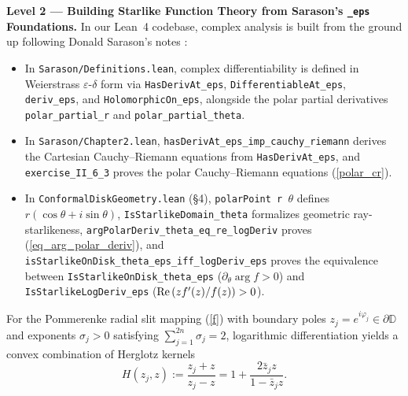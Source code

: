 \documentclass[11pt,reqno]{amsart}
\numberwithin{equation}{section}
\renewcommand{\phi}{\varphi}
\newcommand{\D}{\mathbb{D}}
\newcommand{\eps}{\varepsilon}
\newcommand{\re}{\mbox{\rm Re\,}}
\begin{document}
\begin{leveltwo}
\noindent\textbf{\textcolor{l2border}{Level 2 --- Building Starlike Function Theory from Sarason's \texttt{\_eps} Foundations.}}
In our Lean~4 codebase, complex analysis is built from the ground up following Donald Sarason's notes \cite{Sar}:
\begin{itemize}
\item In \texttt{Sarason/Definitions.lean}, complex differentiability is defined in Weierstrass $\eps$-$\delta$ form via \texttt{HasDerivAt\_eps}, \texttt{DifferentiableAt\_eps}, \texttt{deriv\_eps}, and \texttt{HolomorphicOn\_eps}, alongside the polar partial derivatives \texttt{polar\_partial\_r} and \texttt{polar\_partial\_theta}.
\item In \texttt{Sarason/Chapter2.lean}, \texttt{hasDerivAt\_eps\_imp\_cauchy\_riemann} derives the Cartesian Cauchy--Riemann equations from \texttt{HasDerivAt\_eps}, and \texttt{exercise\_II\_6\_3} proves the polar Cauchy--Riemann equations (\ref{polar_cr}).
\item In \texttt{ConformalDiskGeometry.lean} (\S 4), \texttt{polarPoint r $\theta$} defines $r(\cos\theta + i\sin\theta)$, \texttt{IsStarlikeDomain\_theta} formalizes geometric ray-starlikeness, \texttt{argPolarDeriv\_theta\_eq\_re\_logDeriv} proves (\ref{eq_arg_polar_deriv}), and \texttt{isStarlikeOnDisk\_theta\_eps\_iff\_logDeriv\_eps} proves the equivalence between \texttt{IsStarlikeOnDisk\_theta\_eps} ($\partial_\theta \arg f > 0$) and \texttt{IsStarlikeLogDeriv\_eps} ($\re(z f'(z)/f(z)) > 0$).
\end{itemize}
\end{leveltwo}

For the Pommerenke radial slit mapping (\ref{f}) with boundary poles $z_j = e^{i\phi_j} \in \partial\D$ and exponents $\sigma_j > 0$ satisfying $\sum_{j=1}^{2n} \sigma_j = 2$, logarithmic differentiation yields a convex combination of Herglotz kernels
\begin{equation} \label{eq_herglotz_kernel}
  H(z_j, z) := \frac{z_j + z}{z_j - z} = 1 + \frac{2 \bar{z}_j z}{1 - \bar{z}_j z}.
\end{equation}
\end{document}
